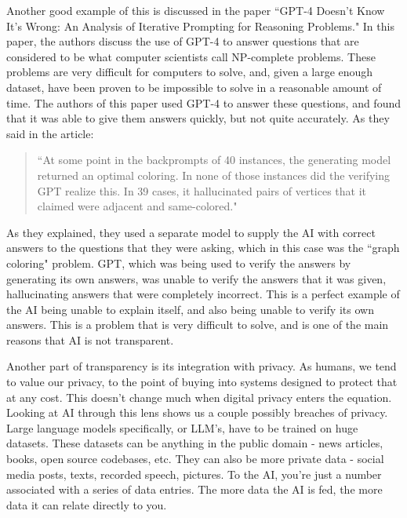 \documentclass[12pt]{article}
\begin{document}
    Another good example of this is discussed in the paper ``GPT-4 Doesn't Know It's Wrong:
    An Analysis of Iterative Prompting for Reasoning Problems." In this paper, the authors
    discuss the use of GPT-4 to answer questions that are considered to be what computer
    scientists call NP-complete problems. These problems are very difficult for computers
    to solve, and, given a large enough dataset, have been proven to be impossible to solve
    in a reasonable amount of time. The authors of this paper used GPT-4 to answer these
    questions, and found that it was able to give them answers quickly, but not quite
    accurately. As they said in the article:
    \begin{quote}
      ``At some point in the backprompts of 40 instances, the generating model returned an
      optimal coloring. In none of those instances did the verifying GPT realize this. In
      39 cases, it hallucinated pairs of vertices that it claimed were adjacent and same-colored." \cite{GPTWrong}
    \end{quote}
    As they explained, they used a separate model to supply the AI with correct answers to
    the questions that they were asking, which in this case was the ``graph coloring" problem.
    GPT, which was being used to verify the answers by generating its own answers, was unable
    to verify the answers that it was given, hallucinating answers that were completely incorrect.
    This is a perfect example of the AI being unable to explain itself, and also being unable
    to verify its own answers. This is a problem that is very difficult to solve, and is one
    of the main reasons that AI is not transparent.

    Another part of transparency is its integration with privacy. As humans, we tend to value our
    privacy, to the point of buying into systems designed to protect that at any cost. This doesn't
    change much when digital privacy enters the equation. Looking at AI through this lens
    shows us a couple possibly breaches of privacy. Large language models specifically, or LLM's,
    have to be trained on huge datasets. These datasets can be anything in the public domain - 
    news articles, books, open source codebases, etc. They can also be more private data - social 
    media posts, texts, recorded speech, pictures. To the AI, you're just a number associated 
    with a series of data entries. The more data the AI is fed, the more data it can relate 
    directly to you.
\end{document}
